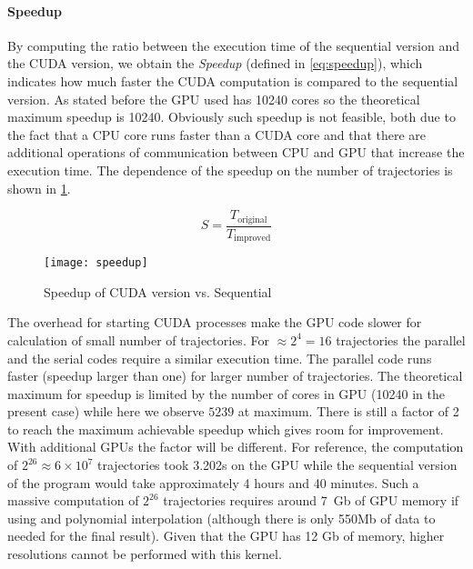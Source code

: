 
\paragraph{Speedup}

By computing the ratio between the execution time of the sequential version and
the CUDA version, we obtain the \emph{Speedup} (defined in \cref{eq:speedup}),
which indicates how much faster the CUDA computation is compared to the
sequential version. As stated before the GPU used has 10240 cores so the
theoretical maximum speedup is 10240. Obviously such speedup is not feasible,
both due to the fact that a CPU core runs faster than a CUDA core and that there
are additional operations of communication between CPU and GPU that increase the
execution time. The dependence of the speedup on the number of trajectories is
shown in \cref{fig:speedup}.

\begin{equation}\label{eq:speedup}
    S = \frac{T_{\text{original}}}{T_{\text{improved}}}
\end{equation}

\begin{figure}[H]
    \centering
    \texttt{[image: speedup]}
    \caption{Speedup of CUDA version vs. Sequential}%
    \label{fig:speedup}
\end{figure}

The overhead for starting CUDA processes make the GPU code slower for
calculation of small number of trajectories. For $\approx 2^4 = 16$ trajectories
the parallel and the serial codes require a similar execution time. The parallel
code runs faster (speedup larger than one) for larger number of trajectories.
The theoretical maximum for speedup is limited by the number of cores in GPU
(10240 in the present case) while here we observe $5239$ at maximum. There is
still a factor of 2 to reach the maximum achievable speedup which gives room
for improvement. With additional GPUs the factor will be different. For reference, the
computation of $2^{26} \approx 6\times 10^7$ trajectories took 3.202s on the GPU
while the sequential version of the program would take approximately 4 hours and
40 minutes. Such a massive computation of $2^{26}$ trajectories requires around
7~Gb of GPU memory if using and polynomial interpolation (although there is only
550Mb of data to needed for the final result). Given that the GPU has 12 Gb of
memory, higher resolutions cannot be performed with this kernel.

